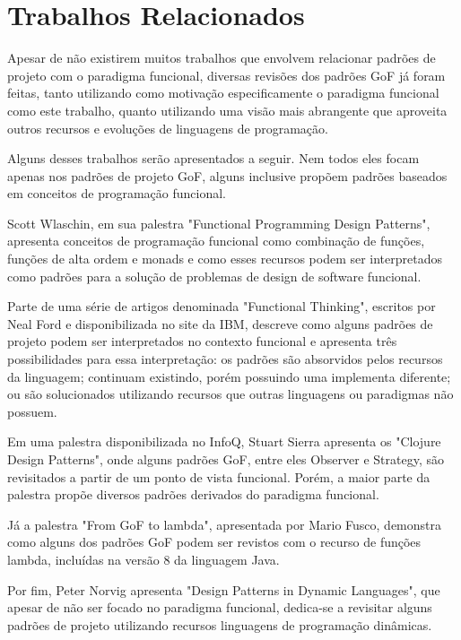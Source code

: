 \chapter{Trabalhos Relacionados}

Apesar de não existirem muitos trabalhos que envolvem
relacionar padrões de projeto com o paradigma funcional, 
diversas revisões dos padrões GoF já foram feitas, 
tanto utilizando como motivação especificamente o 
paradigma funcional como este trabalho, quanto 
utilizando uma visão mais abrangente que aproveita 
outros recursos e evoluções de linguagens de 
programação.

Alguns desses trabalhos serão apresentados a seguir.
Nem todos eles focam apenas nos padrões de 
projeto GoF, alguns inclusive propõem padrões baseados 
em conceitos de programação funcional.

Scott Wlaschin, em sua palestra "Functional Programming 
Design Patterns", apresenta conceitos de programação 
funcional como combinação de funções, funções de alta 
ordem e monads e como esses recursos podem ser 
interpretados como padrões para a solução de problemas 
de design de software funcional.

Parte de uma série de artigos denominada "Functional 
Thinking", escritos por Neal Ford e disponibilizada 
no site da IBM, descreve como alguns padrões de projeto 
podem ser interpretados no contexto funcional e 
apresenta três possibilidades para essa interpretação: 
os padrões são absorvidos pelos recursos da 
linguagem; continuam existindo, porém possuindo 
uma implementa diferente; ou são solucionados 
utilizando recursos que outras linguagens ou 
paradigmas não possuem.

Em uma palestra disponibilizada no InfoQ, Stuart Sierra 
apresenta os "Clojure Design Patterns", onde alguns 
padrões GoF, entre eles Observer e Strategy, são 
revisitados a partir de um ponto de vista funcional. 
Porém, a maior parte da palestra propõe 
diversos padrões derivados do paradigma funcional.

Já a palestra "From GoF to lambda", apresentada por 
Mario Fusco, demonstra como alguns dos padrões GoF 
podem ser revistos com o recurso de funções lambda, 
incluídas na versão 8 da linguagem Java.

Por fim, Peter Norvig apresenta "Design Patterns in 
Dynamic Languages", que apesar de não ser focado 
no paradigma funcional, dedica-se a revisitar alguns 
padrões de projeto utilizando recursos linguagens 
de programação dinâmicas. 
